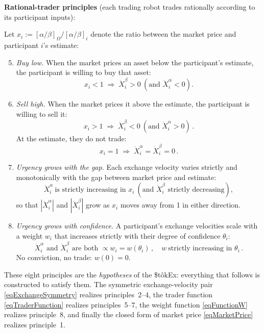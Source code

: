 \documentclass[letterpaper]{article}
\newcommand{\priceAB}{\left[\alpha / \beta\right]}
\newcommand{\StokEx}{\$t\^{o}kEx}
\begin{document}
\textbf{Rational-trader principles} (each trading robot trades rationally according to its participant inputs):

Let $x_i := \priceAB_\Omega / \priceAB_i$ denote the ratio between the market price and participant $i$'s estimate:
\begin{enumerate}
    \setcounter{enumi}{4}
    \item \emph{Buy low.} When the market prices an asset below the participant's estimate, the participant is willing to buy that asset:
    \begin{equation*}
        x_i < 1 \;\Longrightarrow\; \dot{X}_i^\beta > 0 \ \left(\text{and } \dot{X}_i^\alpha < 0\right).
    \end{equation*}
    \item \emph{Sell high.} When the market prices it above the estimate, the participant is willing to sell it:
    \begin{equation*}
        x_i > 1 \;\Longrightarrow\; \dot{X}_i^\beta < 0 \ \left(\text{and } \dot{X}_i^\alpha > 0\right)\,.
    \end{equation*}
    At the estimate, they do not trade:
    \begin{equation*}
        x_i = 1 \;\Longrightarrow\; \dot{X}_i^\alpha = \dot{X}_i^\beta = 0\,.
    \end{equation*}
    \item \emph{Urgency grows with the gap.} Each exchange velocity varies strictly and monotonically with the gap between market price and estimate:
    \begin{equation*}
        \dot{X}_i^\alpha \ \text{is strictly increasing in } x_i \ \left(\text{and } \dot{X}_i^\beta \text{ strictly decreasing}\right),
    \end{equation*}
    so that $|\dot{X}_i^\alpha|$ and $|\dot{X}_i^\beta|$ grow as $x_i$ moves away from 1 in either direction.
    \item \emph{Urgency grows with confidence.} A participant's exchange velocities scale with a weight $w_i$ that increases strictly with their degree of confidence $\theta_i$:
    \begin{equation*}
        \dot{X}_i^\alpha\text{ and }\dot{X}_i^\beta\text{ are both }\propto w_i = w(\theta_i)\,, \quad w \ \text{strictly increasing in } \theta_i\,.
    \end{equation*}
    No conviction, no trade: $w(0) = 0$.
\end{enumerate}

These eight principles are the \emph{hypotheses} of the \StokEx{}: everything that follows is constructed to satisfy them.
The symmetric exchange-velocity pair \eqref{eqExchangeSymmetry} realizes principles~2--4,
the trader function \eqref{eqTraderFunction} realizes principles~5--7, the weight function \eqref{eqFunctionW} realizes principle~8,
and finally the closed form of market price \eqref{eqMarketPrice} realizes principle~1.
\end{document}
